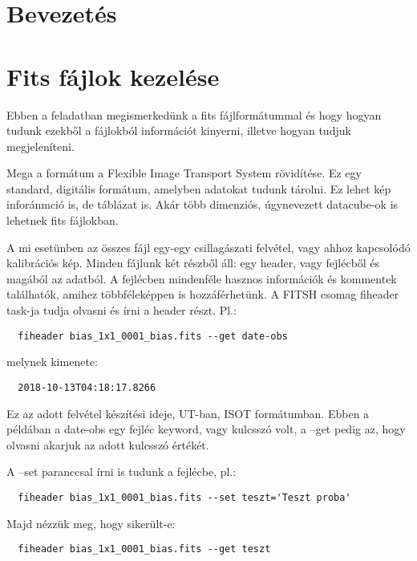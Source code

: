 \documentclass{article}
\begin{document}
\section{Bevezetés}

\section{Fits fájlok kezelése}

Ebben a feladatban megismerkedünk a fits fájlformátummal és hogy hogyan tudunk
ezekből a fájlokból információt kinyerni, illetve hogyan tudjuk megjeleníteni.

Mega a formátum a Flexible Image Transport System rövidítése. Ez egy standard,
digitális formátum, amelyben adatokat tudunk tárolni. Ez lehet kép inforánmció
is, de táblázat is. Akár több dimenziós, úgynevezett datacube-ok is lehetnek
fits fájlokban.

A mi esetünben az összes fájl egy-egy csillagászati felvétel, vagy ahhoz
kapcsolódó kalibrációs kép.
Minden fájlunk két részből áll: egy header, vagy fejlécből és magából az
adatból. A fejlécben mindenféle hasznos információk és kommentek találhatók,
amihez többféleképpen is hozzáférhetünk.
A FITSH csomag fiheader task-ja tudja olvasni és írni a header részt.
Pl.:

\begin{verbatim}
  fiheader bias_1x1_0001_bias.fits --get date-obs
\end{verbatim}

melynek kimenete:
\begin{verbatim}
  2018-10-13T04:18:17.8266
\end{verbatim}

Ez az adott felvétel készítési ideje, UT-ban, ISOT formátumban.
Ebben a példában a date-obs egy fejléc keyword, vagy kulcsszó volt, a --get
pedig az, hogy olvasni akarjuk az adott kulcsszó értékét.

A --set paranccsal írni is tudunk a fejlécbe, pl.:
\begin{verbatim}
  fiheader bias_1x1_0001_bias.fits --set teszt='Teszt proba'
\end{verbatim}

Majd nézzük meg, hogy sikerült-e:
\begin{verbatim}
  fiheader bias_1x1_0001_bias.fits --get teszt
\end{verbatim}
\end{document}
